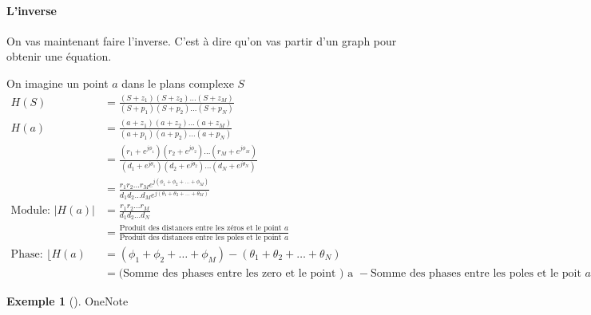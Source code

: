 \documentclass{article}
\theoremstyle{plain}%
\theoremstyle{definition}
\newtheorem{exmp}{Exemple}[section]
\theoremstyle{remark}
\begin{document}
\paragraph*{L'inverse} On vas maintenant faire l'inverse. C'est à dire qu'on vas partir d'un graph pour obtenir une équation.

On imagine un point $ a $ dans le plans complexe $ S $ 
\begin{align*}
    H(S) &= \frac{(S+z_1)(S+z_2)\dots (S+z_M)}{(S+p_1)(S+p_2)\dots (S+p_N)} \\
    H(a) &= \frac{(a+z_1)(a+z_2)\dots (a+z_M)}{(a+p_1)(a+p_2)\dots (a+p_N)} \\
    &= \frac{(r_1+e^{j\phi_1})(r_2+e^{j\phi_2})\dots (r_M+e^{j\phi_M})}{(d_1+e^{j\theta_1})(d_2+e^{j\theta_2})\dots (d_N+e^{j\theta_N})} \\
    &= \frac{r_1 r_2 \dots r_M e^{j(\phi_1 + \phi_2 + \dots + \phi_M)}}{d_1 d_2 \dots d_M e^{j(\theta_1 + \theta_2 + \dots + \theta_M)}} \\
    \text{Module: } \left| H(a) \right|  &= \frac{r_1 r_2 \dots r_M}{d_1 d_2 \dots d_N} \\
    &= \frac{\text{Produit des distances entre les zéros et le point } a}{\text{Produit des distances entre les poles et le point } a} \\
    \text{Phase: } \lfloor H(a) &= (\phi_1+ \phi_2 + \dots + \phi_M) - (\theta _1 + \theta _2 + \dots + \theta _N) \\
    &= \text{(Somme des phases entre les zero et le point ) a } - \text{Somme des phases entre les poles et le poit } a
\end{align*}

\begin{exmp}[]
    OneNote
\end{exmp}
\end{document}
